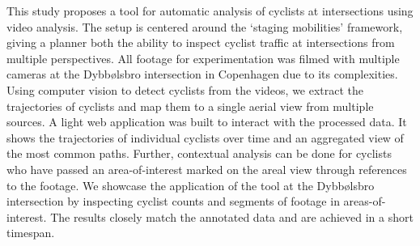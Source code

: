 This study proposes a tool for automatic analysis of cyclists at intersections using video analysis. 
The setup is centered around the ‘staging mobilities’ framework, giving a planner both the ability to inspect cyclist traffic at intersections from multiple perspectives. 
All footage for experimentation was filmed with multiple cameras at the Dybbølsbro intersection in Copenhagen due to its complexities.
Using computer vision to detect cyclists from the videos, we extract the trajectories of cyclists and map them to a single aerial view from multiple sources.
A light web application was built to interact with the processed data. It shows the trajectories of individual cyclists over time and an aggregated view of the most common paths. Further, 
contextual analysis can be done for cyclists who have passed an area-of-interest marked on the areal view through references to the footage. 
We showcase the application of the tool at the Dybbølsbro intersection by inspecting cyclist counts and segments of footage in areas-of-interest. The results closely match the annotated data and are achieved in a short timespan.